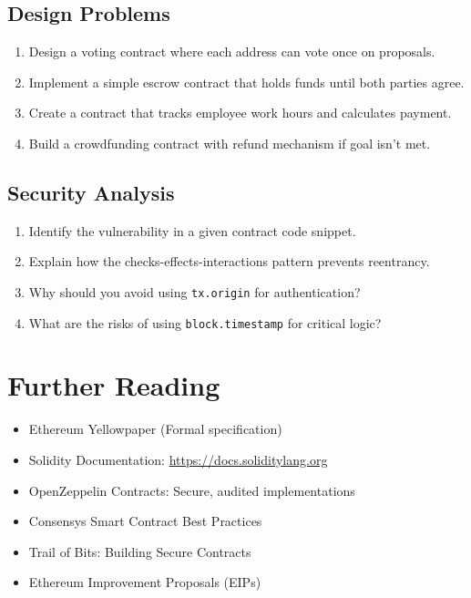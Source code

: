 \documentclass[11pt,a4paper]{article}
\begin{document}
\subsection{Design Problems}

\begin{enumerate}
  \item Design a voting contract where each address can vote once on proposals.
  \item Implement a simple escrow contract that holds funds until both parties agree.
  \item Create a contract that tracks employee work hours and calculates payment.
  \item Build a crowdfunding contract with refund mechanism if goal isn't met.
\end{enumerate}

\subsection{Security Analysis}

\begin{enumerate}
  \item Identify the vulnerability in a given contract code snippet.
  \item Explain how the checks-effects-interactions pattern prevents reentrancy.
  \item Why should you avoid using \texttt{tx.origin} for authentication?
  \item What are the risks of using \texttt{block.timestamp} for critical logic?
\end{enumerate}

\section{Further Reading}

\begin{itemize}
  \item Ethereum Yellowpaper (Formal specification)
  \item Solidity Documentation: \url{https://docs.soliditylang.org}
  \item OpenZeppelin Contracts: Secure, audited implementations
  \item Consensys Smart Contract Best Practices
  \item Trail of Bits: Building Secure Contracts
  \item Ethereum Improvement Proposals (EIPs)
\end{itemize}
\end{document}
